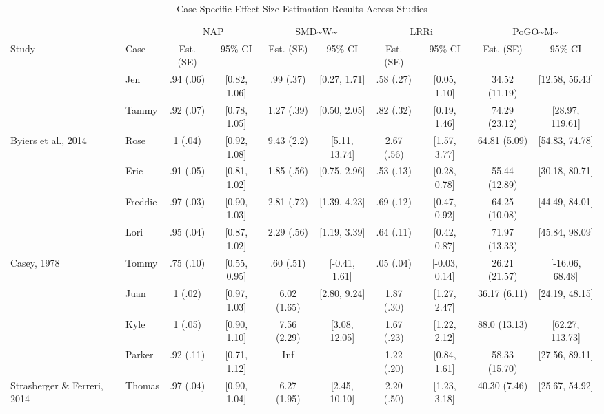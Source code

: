 \documentclass[
]{book}
\begin{document}
\begin{table}

\caption{\label{tab:case-es-est}Case-Specific Effect Size Estimation Results Across Studies}
\centering
\begin{tabular}[t]{l|l|c|c|c|c|c|c|c|c}
\hline
\multicolumn{2}{c|}{ } & \multicolumn{2}{c|}{NAP} & \multicolumn{2}{c|}{SMD\textasciitilde{}W\textasciitilde{}} & \multicolumn{2}{c|}{LRRi} & \multicolumn{2}{c}{PoGO\textasciitilde{}M\textasciitilde{}} \\
\cline{3-4} \cline{5-6} \cline{7-8} \cline{9-10}
Study & Case & Est. (SE) & 95\% CI & Est. (SE) & 95\% CI & Est. (SE) & 95\% CI & Est. (SE) & 95\% CI\\
\hline
 & Jen & .94 (.06) & [0.82, 1.06] & .99 (.37) & [0.27, 1.71] & .58 (.27) & [0.05, 1.10] & 34.52 (11.19) & [12.58, 56.43]\\
\cline{2-10}
 & Tammy & .92 (.07) & [0.78, 1.05] & 1.27 (.39) & [0.50, 2.05] & .82 (.32) & [0.19, 1.46] & 74.29 (23.12) & [28.97, 119.61]\\
\cline{2-10}
\multirow[t]{-3}{*}{\raggedright\arraybackslash Byiers et al., 2014} & Rose & 1 (.04) & [0.92, 1.08] & 9.43 (2.2) & [5.11, 13.74] & 2.67 (.56) & [1.57, 3.77] & 64.81 (5.09) & [54.83, 74.78]\\
\cline{1-10}
 & Eric & .91 (.05) & [0.81, 1.02] & 1.85 (.56) & [0.75, 2.96] & .53 (.13) & [0.28, 0.78] & 55.44 (12.89) & [30.18, 80.71]\\
\cline{2-10}
 & Freddie & .97 (.03) & [0.90, 1.03] & 2.81 (.72) & [1.39, 4.23] & .69 (.12) & [0.47, 0.92] & 64.25 (10.08) & [44.49, 84.01]\\
\cline{2-10}
 & Lori & .95 (.04) & [0.87, 1.02] & 2.29 (.56) & [1.19, 3.39] & .64 (.11) & [0.42, 0.87] & 71.97 (13.33) & [45.84, 98.09]\\
\cline{2-10}
\multirow[t]{-4}{*}{\raggedright\arraybackslash Casey, 1978} & Tommy & .75 (.10) & [0.55, 0.95] & .60 (.51) & [-0.41, 1.61] & .05 (.04) & [-0.03, 0.14] & 26.21 (21.57) & [-16.06, 68.48]\\
\cline{1-10}
 & Juan & 1 (.02) & [0.97, 1.03] & 6.02 (1.65) & [2.80, 9.24] & 1.87 (.30) & [1.27, 2.47] & 36.17 (6.11) & [24.19, 48.15]\\
\cline{2-10}
 & Kyle & 1 (.05) & [0.90, 1.10] & 7.56 (2.29) & [3.08, 12.05] & 1.67 (.23) & [1.22, 2.12] & 88.0 (13.13) & [62.27, 113.73]\\
\cline{2-10}
 & Parker & .92 (.11) & [0.71, 1.12] & Inf &  & 1.22 (.20) & [0.84, 1.61] & 58.33 (15.70) & [27.56, 89.11]\\
\cline{2-10}
\multirow[t]{-4}{*}{\raggedright\arraybackslash Strasberger \& Ferreri, 2014} & Thomas & .97 (.04) & [0.90, 1.04] & 6.27 (1.95) & [2.45, 10.10] & 2.20 (.50) & [1.23, 3.18] & 40.30 (7.46) & [25.67, 54.92]\\
\hline
\end{tabular}
\end{table}
\end{document}
